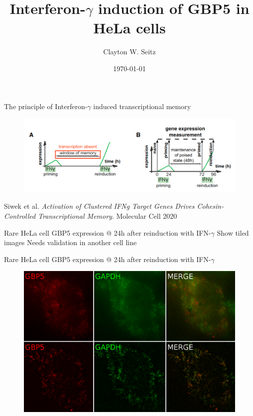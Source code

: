 \documentclass[aspectratio=1610]{beamer}					%
\title{Interferon-$\gamma$ induction of GBP5 in HeLa cells}	%
\author{Clayton W. Seitz}								%
\date{\today}									%
\begin{document}
\begin{frame}
  \titlepage
\end{frame}


%

\begin{frame}{The principle of Interferon-$\gamma$ induced transcriptional memory}
\begin{figure}
\includegraphics[width=14cm]{Memory.png}
\caption{}
\end{figure}

Siwek et al. \textit{Activation of Clustered IFNg Target Genes Drives Cohesin-Controlled Transcriptional Memory}. Molecular Cell 2020

\end{frame}


\begin{frame}{Rare HeLa cell GBP5 expression @ 24h after reinduction with IFN-$\gamma$}
Show tiled images
Needs validation in another cell line
\end{frame}

\begin{frame}{Rare HeLa cell GBP5 expression @ 24h after reinduction with IFN-$\gamma$}
\begin{figure}
\includegraphics[width=12cm]{Stains.png}
\end{figure}
\end{frame}
\end{document}
